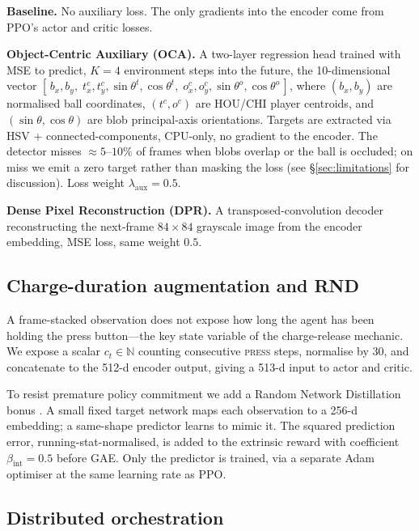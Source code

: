 \documentclass{article}
\begin{document}
\textbf{Baseline.} No auxiliary loss. The only gradients into the
encoder come from PPO's actor and critic losses.

\textbf{Object-Centric Auxiliary (OCA).} A two-layer regression
head trained with MSE to predict, $K=4$ environment steps into
the future, the 10-dimensional vector
$[\,b_x, b_y,\; t^c_x, t^c_y, \sin\theta^t, \cos\theta^t,\;
o^c_x, o^c_y, \sin\theta^o, \cos\theta^o\,]$,
where $(b_x,b_y)$ are normalised ball coordinates,
$(t^c, o^c)$ are HOU/CHI player centroids, and
$(\sin\theta, \cos\theta)$ are blob principal-axis orientations.
Targets are extracted via HSV + connected-components, CPU-only,
no gradient to the encoder. The detector misses
$\approx 5$--$10\%$ of frames when blobs overlap or the ball is
occluded; on miss we emit a zero target rather than masking the
loss (see \S\ref{sec:limitations} for discussion). Loss weight
$\lambda_\text{aux}=0.5$.

\textbf{Dense Pixel Reconstruction (DPR).} A transposed-convolution
decoder reconstructing the next-frame $84\times84$ grayscale image
from the encoder embedding, MSE loss, same weight $0.5$.

\subsection{Charge-duration augmentation and RND}
\label{sec:charge-rnd}

A frame-stacked observation does not expose how long the agent has
been holding the press button---the key state variable of the
charge-release mechanic. We expose a scalar
$c_t \in \mathbb{N}$ counting consecutive \textsc{press} steps,
normalise by $30$, and concatenate to the 512-d encoder output,
giving a 513-d input to actor and critic.

To resist premature policy commitment we add a Random Network
Distillation bonus \cite{burda2018rnd}. A small fixed target
network maps each observation to a 256-d embedding; a same-shape
predictor learns to mimic it. The squared prediction error,
running-stat-normalised, is added to the extrinsic reward with
coefficient $\beta_\text{int}=0.5$ before GAE. Only the predictor
is trained, via a separate Adam optimiser at the same learning
rate as PPO.

\subsection{Distributed orchestration}
\label{sec:orchestration}
\end{document}
